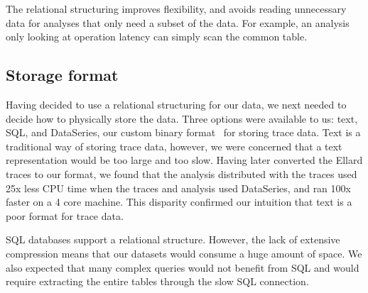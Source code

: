 The relational structuring improves flexibility, and avoids reading unnecessary data for
analyses that only need a subset of the data.
For example, an analysis only looking at operation
latency can simply scan the common table.

\subsection{Storage format}

Having decided to use a relational structuring for our data, we next
needed to decide how to physically store the data.  Three
options were available to us: text, SQL, and DataSeries, our custom
binary format~\cite{DSTechnicalReportSnapshot} for storing trace data.
Text is a traditional way of storing trace data, however, we were
concerned that a text representation would be too large and too slow.
Having later converted the Ellard traces to our format, we found that
the analysis distributed with the traces used 25x less CPU time when
the traces and analysis used DataSeries, and ran 100x faster on a 4
core machine. This disparity confirmed our intuition that text is a
poor format for trace data.


SQL databases support a relational structure. However, the lack of 
extensive compression means that our datasets would 
consume a huge amount of space. We also expected that many complex
queries would not benefit from SQL and would require extracting
the entire tables through the slow SQL connection.

